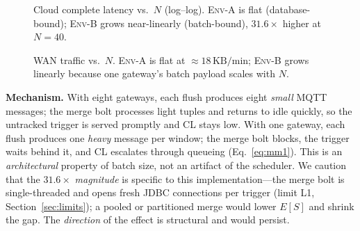 \documentclass[conference]{IEEEtran}
\newcommand{\KBmin}{\,\text{KB/min}}
\begin{document}
\begin{figure}[t]
\centering
{}
\caption{Cloud complete latency vs.\ $N$ (log--log). \textsc{Env-A} is flat
(database-bound); \textsc{Env-B} grows near-linearly (batch-bound), $31.6\times$
higher at $N=40$.}
\label{fig:cl-vs-n}
\end{figure}

\begin{figure}[t]
\centering
{}
\caption{WAN traffic vs.\ $N$. \textsc{Env-A} is flat at $\approx\!18\KBmin$;
\textsc{Env-B} grows linearly because one gateway's batch payload scales with $N$.}
\label{fig:wan-vs-n}
\end{figure}

\textbf{Mechanism.} With eight gateways, each flush produces eight \emph{small}
MQTT messages; the merge bolt processes light tuples and returns to idle quickly,
so the untracked trigger is served promptly and CL stays low. With one gateway,
each flush produces one \emph{heavy} message per window; the merge bolt blocks,
the trigger waits behind it, and CL escalates through queueing
(Eq.~\eqref{eq:mm1}). This is an \emph{architectural} property of batch size, not
an artifact of the scheduler. We caution that the $31.6\times$ \emph{magnitude} is
specific to this implementation---the merge bolt is single-threaded and opens
fresh JDBC connections per trigger (limit L1, Section~\ref{sec:limits}); a pooled
or partitioned merge would lower $E[S]$ and shrink the gap. The \emph{direction}
of the effect is structural and would persist.
\end{document}
